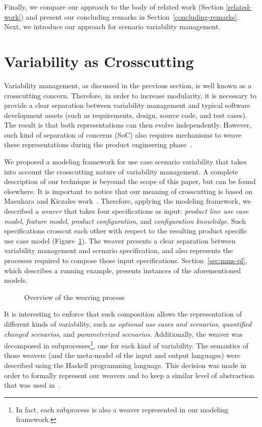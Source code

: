 \documentclass{acm_proc_article-sp}
\begin{document}
Finally, we compare our approach to the body of related work (Section \ref{related-work}) and present our concluding remarks in 
Section~\ref{concluding-remarks}. Next, we introduce our approach for scenario variability management.
   
\section{Variability as Crosscutting}
\label{scenario-variability}

Variability management, as discussed in the previous section, is well known as a crosscutting concern. Therefore, in order to increase modularity, it is necessary to provide a clear separation between 
variability management and typical software development assets (such as requirements, design, source code, and test cases). The result is that both representations can then evolve independently. However, such kind of separation of concerns (SoC) also requires mechanisms to weave these representations during the product engineering phase~\cite{northrop-spl-book}.

We proposed a modeling framework for use case scenario variability that takes into account the crosscutting nature of variability management. A complete description of our technique is beyound the scope of this paper, but can be found elsewhere\cite{spg-url}. It is important to notice that our meaning of crosscutting is based on Masuhara and Kiczales work~\cite{masuhara-ecoop-2003}. Therefore, applying the modeling framework, we described a \emph{weaver} that takes four specifications as input: \emph{product line use case model}, \emph{feature model}, \emph{product configuration}, and \emph{configuration knowledge}. Such specifications crosscut each other with respect to the resulting product specific use case model (Figure~\ref{fig:wp}). The weaver presents a clear separation between variability management and scenario specification, and also represents the processes required to compose those input specifications. Section~\ref{sec:mms-pl}, which describes a running example, presents instances of the aforementioned models.

\begin{figure}[h]
\centering
{}
\caption{Overview of the weaving process}
\label{fig:wp}
\end{figure}

It is interesting to enforce that such composition allows the representation of different kinds of variability, such as \emph{optional use cases and scenarios}, \emph{quantified changed scenarios}, and 
\emph{parameterized scenarios}. Additionally, the weaver was decomposed in subprocesses\footnote{In fact, each subprocess is also a weaver represented in our modeling framework.}, one for each kind of variability. The semantics of those weavers (and the meta-model of the input and output languages) were described using the Haskell programming language. This decision was made in order to formally represent our weavers and to keep a similar level of abstraction that was used in~\cite{masuhara-ecoop-2003}.
\end{document}
